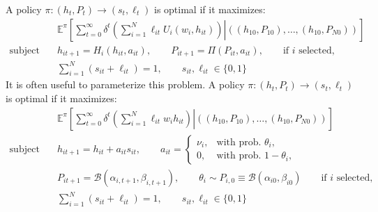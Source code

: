 \documentclass[10 pt]{article}
\newcommand{\gen}[1]{#1}
\newcommand{\gen}[1]{}
\newcommand{\sbr}[1]{\left[ #1 \right]}
\newcommand{\pr}[1]{\left( #1 \right)}
\begin{document}
\gen{
A policy $\pi: (h_t, P_t) \to (s_t, \ell_t)$ is optimal if it maximizes: 
\begin{align*}
& \mathbb{E}^\pi \sbr{
   \sum_{t=0}^\infty \delta^t 
   \left. \pr{\sum_{i=1}^N \ell_{it} U_i(w_i, h_{it})} \right\vert
   \pr{(h_{10}, P_{10}), \dots, (h_{10}, P_{N0})}
} \\
\text{subject to} \quad& h_{it+1} = H_i (h_{it}, a_{it}), \quad \quad
P_{it+1} = \Pi (P_{it}, a_{it}), 
\quad \quad \text{if $i$ selected,} \\
\quad& \sum_{i=1}^N (s_{it} + \ell_{it}) = 1, \quad \quad s_{it}, \ell_{it} \in \{0,1\}
\end{align*}
It is often useful to parameterize this problem.}
A policy $\pi: (h_t, P_t) \to (s_t, \ell_t)$ is optimal if it maximizes:
\begin{align*}
& \mathbb{E}^\pi \sbr{
   \sum_{t=0}^\infty \delta^t 
   \left. \pr{\sum_{i=1}^N \ell_{it} w_i h_{it}} \right\vert
   \pr{(h_{10}, P_{10}), \dots, (h_{10}, P_{N0})}
} \\
\text{subject to} \quad& h_{it+1} = h_{it}+ a_{it} s_{it}, \quad \quad a_{it} = 
   \begin{cases} 
      \nu_i, & \text{with prob. } \theta_i,  \\ 
      0, & \text{with prob. } 1 - \theta_i,
   \end{cases} 
   \\
\quad& P_{it+1} = \mathcal{B} (\alpha_{i,t+1}, \beta_{i,t+1}), 
   \quad \quad \theta_i \sim P_{i,0} \equiv \mathcal{B} (\alpha_{i0}, \beta_{i0})
   \quad \quad \text{if $i$ selected,} \\
\quad& \sum_{i=1}^N (s_{it} + \ell_{it}) = 1, \quad \quad s_{it}, \ell_{it} \in \{0,1\}
\end{align*}

\end{document}
